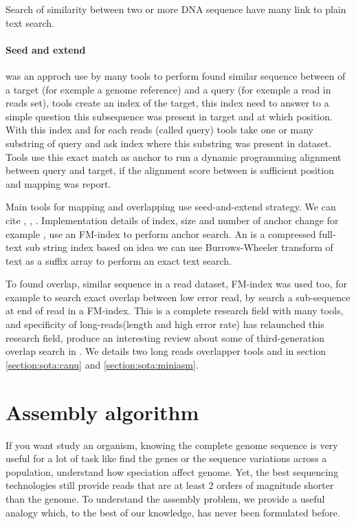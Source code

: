 \documentclass[./main.tex]{subfiles}
\begin{document}
Search of similarity between two or more DNA sequence have many link to plain text search.

\paragraph{Seed and extend} was an approch use by many tools to perform found similar sequence between of a target (for exemple a genome reference) and a query (for exemple a read in reads set), tools create an index of the target, this index need to answer to a simple question this subsequence was present in target and at which position. With this index and for each reads (called query) tools take one or many substring of query and ask index where this substring was present in dataset. Tools use this exact match as anchor to run a \citeauthor{smith_waterman}\cite{smith_waterman} dynamic programming alignment between query and target, if the alignment score between is sufficient position and mapping was report.

Main tools for mapping and overlapping use seed-and-extend strategy. We can cite  \cite{blast_one, blast_two},  \cite{bwa_mem},  \cite{blasr}. Implementation details of index, size and number of anchor change for example ,  use an FM-index \cite{fm-index} to perform anchor search. An is a compressed full-text sub string index based on idea we can use Burrows-Wheeler transform of text as a suffix array to perform an exact text search. 

To found overlap, similar sequence in a read dataset, FM-index was used too, for example  \cite{SGA} to search exact overlap between low error read, by search a sub-sequence at end of read in a FM-index. This is a complete research field with many tools, and specificity of long-reads(length and high error rate) has relaunched this research field, \citeauthor{ovl_bench} produce an interesting review about some of third-generation overlap search in \cite{ovl_bench}. We details two long reads overlapper tools \mhap and \minimap in section \ref{section:sota:canu} and \ref{section:sota:miniasm}.

\section{Assembly algorithm}

If you want study an organism, knowing the complete genome sequence is very useful for a lot of task like find the genes or the sequence variations across a population, understand how speciation affect genome. Yet, the best sequencing technologies still provide reads that are at least 2 orders of magnitude shorter than the genome. To understand the assembly problem, we provide a useful analogy which, to the best of our knowledge, has never been formulated before.
\end{document}
